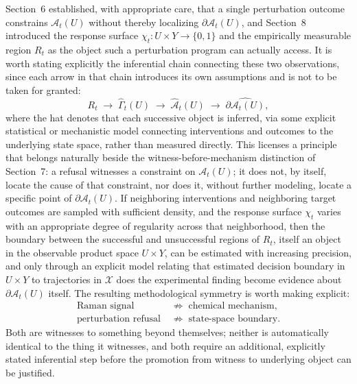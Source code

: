 \documentclass[11pt]{article}
\begin{document}
Section~6 established, with appropriate care, that a single perturbation outcome constrains $\mathcal{A}_t(U)$ without thereby localizing $\partial \mathcal{A}_t(U)$, and Section~8 introduced the response surface $\chi_t : U \times Y \to \{0,1\}$ and the empirically measurable region $R_t$ as the object such a perturbation program can actually access. It is worth stating explicitly the inferential chain connecting these two observations, since each arrow in that chain introduces its own assumptions and is not to be taken for granted:
\begin{equation}
R_t \;\longrightarrow\; \widehat{\Gamma}_t(U) \;\longrightarrow\; \widehat{\mathcal{A}}_t(U) \;\longrightarrow\; \widehat{\partial \mathcal{A}_t(U)},
\end{equation}
where the hat denotes that each successive object is inferred, via some explicit statistical or mechanistic model connecting interventions and outcomes to the underlying state space, rather than measured directly. This licenses a principle that belongs naturally beside the witness-before-mechanism distinction of Section~7: a refusal witnesses a constraint on $\mathcal{A}_t(U)$; it does not, by itself, locate the cause of that constraint, nor does it, without further modeling, locate a specific point of $\partial \mathcal{A}_t(U)$. If neighboring interventions and neighboring target outcomes are sampled with sufficient density, and the response surface $\chi_t$ varies with an appropriate degree of regularity across that neighborhood, then the boundary between the successful and unsuccessful regions of $R_t$, itself an object in the observable product space $U \times Y$, can be estimated with increasing precision, and only through an explicit model relating that estimated decision boundary in $U \times Y$ to trajectories in $\mathcal{X}$ does the experimental finding become evidence about $\partial \mathcal{A}_t(U)$ itself. The resulting methodological symmetry is worth making explicit:
\begin{align}
\text{Raman signal} &\;\not\Longrightarrow\; \text{chemical mechanism}, \\
\text{perturbation refusal} &\;\not\Longrightarrow\; \text{state-space boundary}.
\end{align}
Both are witnesses to something beyond themselves; neither is automatically identical to the thing it witnesses, and both require an additional, explicitly stated inferential step before the promotion from witness to underlying object can be justified.
\end{document}
